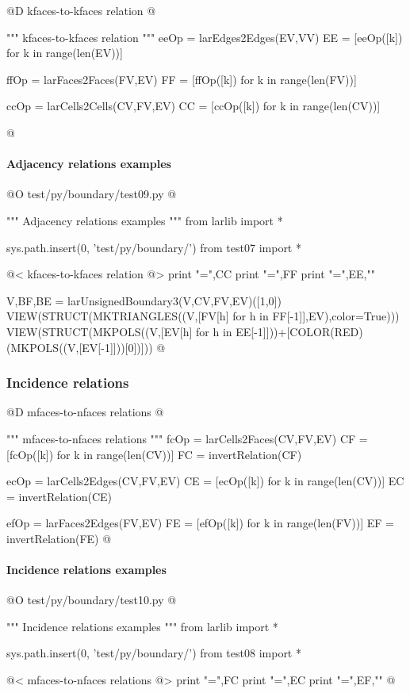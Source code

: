 \documentclass[11pt,oneside]{article}    %
\begin{document}
@D kfaces-to-kfaces relation
@{""" kfaces-to-kfaces relation """
eeOp = larEdges2Edges(EV,VV)
EE = [eeOp([k]) for k in range(len(EV))]

ffOp = larFaces2Faces(FV,EV)
FF = [ffOp([k]) for k in range(len(FV))]

ccOp = larCells2Cells(CV,FV,EV)
CC = [ccOp([k]) for k in range(len(CV))]

@}

\paragraph{Adjacency relations examples}
@O test/py/boundary/test09.py
@{""" Adjacency relations examples """
from larlib import *

sys.path.insert(0, 'test/py/boundary/')
from test07 import *

@< kfaces-to-kfaces relation @>
print "\nCC =",CC
print "\nFF =",FF
print "\nEE =",EE,"\n"

V,BF,BE = larUnsignedBoundary3(V,CV,FV,EV)([1,0])
VIEW(STRUCT(MKTRIANGLES((V,[FV[h] for h in FF[-1]],EV),color=True)))
VIEW(STRUCT(MKPOLS((V,[EV[h] for h in EE[-1]]))+[COLOR(RED)(MKPOLS((V,[EV[-1]]))[0])]))
@}


\subsubsection{Incidence relations}

@D mfaces-to-nfaces relations
@{""" mfaces-to-nfaces relations """
fcOp = larCells2Faces(CV,FV,EV)
CF = [fcOp([k]) for k in range(len(CV))]
FC = invertRelation(CF)

ecOp = larCells2Edges(CV,FV,EV)
CE = [ecOp([k]) for k in range(len(CV))]
EC = invertRelation(CE)
    
efOp = larFaces2Edges(FV,EV)
FE = [efOp([k]) for k in range(len(FV))]
EF = invertRelation(FE)
@}

\paragraph{Incidence relations examples}
@O test/py/boundary/test10.py
@{""" Incidence relations examples """
from larlib import *

sys.path.insert(0, 'test/py/boundary/')
from test08 import *

@< mfaces-to-nfaces relations @>
print "\nFC =",FC
print "\nEC =",EC
print "\nEF =",EF,"\n"
@}
\end{document}
